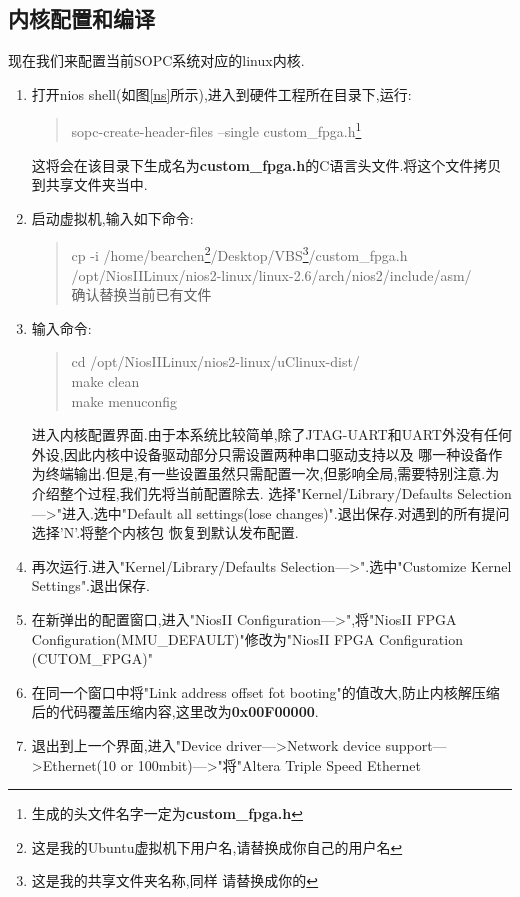 \documentclass[12pt,a4paper,titlepage]{article}
\begin{document}
\subsection{内核配置和编译}
现在我们来配置当前SOPC系统对应的linux内核.
\begin{enumerate}
\item 打开nios shell(如图\ref{ns}所示),进入到硬件工程所在目录下,运行:
\begin{verse}
sopc-create-header-files --single custom\_fpga.h\footnote{生成的头文件名字一定为\textbf{custom\_fpga.h}}
\end{verse}
这将会在该目录下生成名为\textbf{custom\_fpga.h}的C语言头文件.将这个文件拷贝到共享文件夹当中.
\item 启动虚拟机,输入如下命令:
\begin{verse}
cp -i /home/bearchen\footnote{这是我的Ubuntu虚拟机下用户名,请替换成你自己的用户名}/Desktop/VBS\footnote{这是我的共享文件夹名称,同样
请替换成你的}/custom\_fpga.h /opt/NiosIILinux/nios2-linux/linux-2.6/arch/nios2/include/asm/\\
确认替换当前已有文件
\end{verse}
\item 输入命令:
\begin{verse}
cd /opt/NiosIILinux/nios2-linux/uClinux-dist/\\
make clean\\
make menuconfig\\
\end{verse}
进入内核配置界面.由于本系统比较简单,除了JTAG-UART和UART外没有任何外设,因此内核中设备驱动部分只需设置两种串口驱动支持以及
哪一种设备作为终端输出.但是,有一些设置虽然只需配置一次,但影响全局,需要特别注意.为介绍整个过程,我们先将当前配置除去.
选择"Kernel/Library/Defaults Selection--->"进入.选中"Default all settings(lose changes)".退出保存.对遇到的所有提问选择'N'.将整个内核包
恢复到默认发布配置.
\item 再次运行.进入"Kernel/Library/Defaults Selection--->".选中"Customize Kernel Settings".退出保存.
\item 在新弹出的配置窗口,进入"NiosII Configuration--->",将"NiosII FPGA Configuration(MMU\_DEFAULT)"修改为"NiosII FPGA Configuration
(CUTOM\_FPGA)"
\item 在同一个窗口中将"Link address offset fot booting"的值改大,防止内核解压缩后的代码覆盖压缩内容,这里改为\textbf{0x00F00000}.
\item 退出到上一个界面,进入"Device driver--->Network device support--->Ethernet(10 or 100mbit)--->"将"Altera Triple Speed Ethernet 

\end{enumerate}
\end{document}
